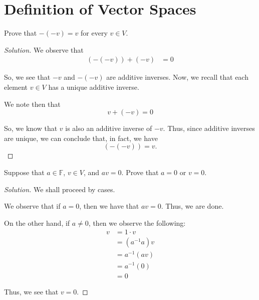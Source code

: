 \documentclass[openany]{book}
\newenvironment{solution}{\begin{proof}[Solution]}{\end{proof}}
\begin{document}
	\section{Definition of Vector Spaces}
	\begin{hw}
		Prove that $-(-v) = v$ for every $v \in V$.
	\end{hw}
	\begin{solution}
		We observe that
		\begin{align*}
			(-(-v)) + (-v) &= 0
		\end{align*}
		
		So, we see that $-v$ and $-(-v)$ are additive inverses. Now, we recall that each element $v \in V$ has a unique additive inverse.
		
		We note then that
		\begin{equation*}
			v + (-v) = 0
		\end{equation*}
	
		So, we know that $v$ is also an additive inverse of $-v$. Thus, since additive inverses are unique, we can conclude that, in fact, we have
		\begin{equation*}
			(-(-v)) = v.
		\end{equation*}
	\end{solution}

	\begin{hw}
		Suppose that $a \in \mathbb{F}$, $v \in V$, and $av = 0$. Prove that $a = 0$ or $v = 0$.
	\end{hw}
	\begin{solution}
		We shall proceed by cases.
		
		We observe that if $a = 0$, then we have that $av = 0$. Thus, we are done.
		
		On the other hand, if $a \neq 0$, then we observe the following:
		\begin{align*}
			v &= 1 \cdot v \\
			&= (a^{-1}a)v \\ 
			&= a^{-1}(av) \\
			&= a^{-1}(0) \\
			&= 0
		\end{align*}
	
		Thus, we see that $v = 0$.
	\end{solution}
\end{document}
